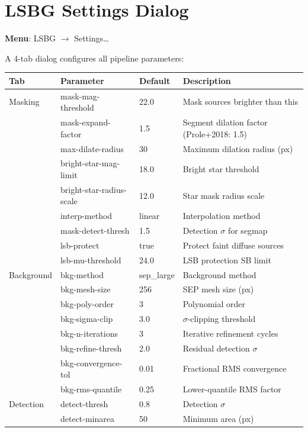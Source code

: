 \documentclass[11pt,fleqn]{book}
\begin{document}
\section{LSBG Settings Dialog}
\label{sec:lsbg-settings}

\textbf{Menu}: LSBG $\to$ Settings\ldots

A 4-tab dialog configures all pipeline parameters:

\begin{center}
\begin{longtable}{L{2.5cm} L{4cm} L{2cm} L{4cm}}
\toprule
\textbf{Tab} & \textbf{Parameter} & \textbf{Default} & \textbf{Description} \\
\midrule
\endhead
Masking & mask-mag-threshold & 22.0 & Mask sources brighter than this \\
 & mask-expand-factor & 1.5 & Segment dilation factor (Prole+2018: 1.5) \\
 & max-dilate-radius & 30 & Maximum dilation radius (px) \\
 & bright-star-mag-limit & 18.0 & Bright star threshold \\
 & bright-star-radius-scale & 12.0 & Star mask radius scale \\
 & interp-method & linear & Interpolation method \\
 & mask-detect-thresh & 1.5 & Detection $\sigma$ for segmap \\
 & lsb-protect & true & Protect faint diffuse sources \\
 & lsb-mu-threshold & 24.0 & LSB protection SB limit \\
\midrule
Background & bkg-method & sep\_large & Background method \\
 & bkg-mesh-size & 256 & SEP mesh size (px) \\
 & bkg-poly-order & 3 & Polynomial order \\
 & bkg-sigma-clip & 3.0 & $\sigma$-clipping threshold \\
 & bkg-n-iterations & 3 & Iterative refinement cycles \\
 & bkg-refine-thresh & 2.0 & Residual detection $\sigma$ \\
 & bkg-convergence-tol & 0.01 & Fractional RMS convergence \\
 & bkg-rms-quantile & 0.25 & Lower-quantile RMS factor \\
\midrule
Detection & detect-thresh & 0.8 & Detection $\sigma$ \\
 & detect-minarea & 50 & Minimum area (px) \\

\end{longtable}
\end{center}
\end{document}
